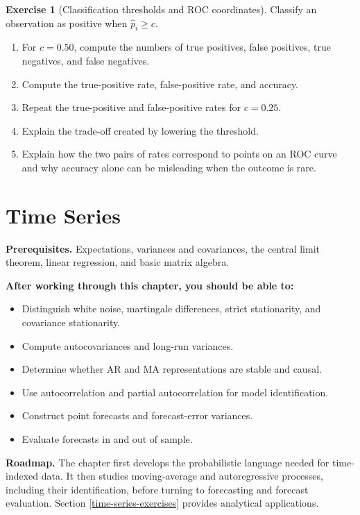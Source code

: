 \documentclass[
  11pt,
]{book}
\providecommand{\tightlist}{%
  \setlength{\itemsep}{0pt}\setlength{\parskip}{0pt}}
\theoremstyle{definition}
\theoremstyle{definition}
\theoremstyle{definition}
\newtheorem{exercise}{Exercise}[chapter]
\theoremstyle{definition}
\theoremstyle{remark}
\begin{document}
\begin{exercisebox}
\begin{exercise}[Classification thresholds and ROC coordinates]
Classify an observation as positive when \(\hat p_i\ge c\).

\begin{enumerate}
\def\labelenumi{\arabic{enumi}.}
\tightlist
\item
  For \(c=0.50\), compute the numbers of true positives, false positives, true negatives, and false negatives.
\item
  Compute the true-positive rate, false-positive rate, and accuracy.
\item
  Repeat the true-positive and false-positive rates for \(c=0.25\).
\item
  Explain the trade-off created by lowering the threshold.
\item
  Explain how the two pairs of rates correspond to points on an ROC curve and why accuracy alone can be misleading when the outcome is rare.
\end{enumerate}

\end{exercise}

\end{exercisebox}

\chapter{Time Series}\label{TS}

\textbf{Prerequisites.} Expectations, variances and covariances, the central limit theorem, linear regression, and basic matrix algebra.

\textbf{After working through this chapter, you should be able to:}

\begin{itemize}
\tightlist
\item
  Distinguish white noise, martingale differences, strict stationarity, and covariance stationarity.
\item
  Compute autocovariances and long-run variances.
\item
  Determine whether AR and MA representations are stable and causal.
\item
  Use autocorrelation and partial autocorrelation for model identification.
\item
  Construct point forecasts and forecast-error variances.
\item
  Evaluate forecasts in and out of sample.
\end{itemize}

\textbf{Roadmap.} The chapter first develops the probabilistic language needed for time-indexed data. It then studies moving-average and autoregressive processes, including their identification, before turning to forecasting and forecast evaluation. Section \ref{time-series-exercises} provides analytical applications.
\end{document}
